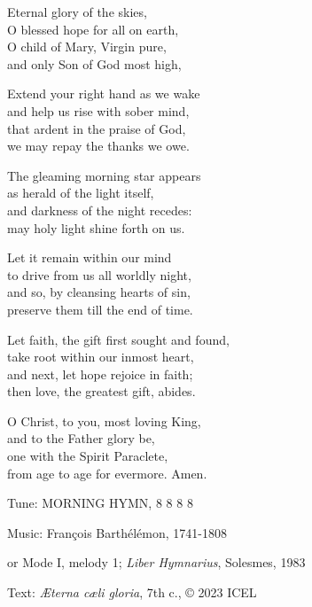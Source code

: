 \hymn

\begin{hymnverse}
Eternal glory of the skies,\\
O blessed hope for all on earth,\\
O child of Mary, Virgin pure,\\
and only Son of God most high,

Extend your right hand as we wake\\
and help us rise with sober mind,\\
that ardent in the praise of God,\\
we may repay the thanks we owe.

The gleaming morning star appears\\
as herald of the light itself,\\
and darkness of the night recedes:\\
may holy light shine forth on us.

Let it remain within our mind\\
to drive from us all worldly night,\\
and so, by cleansing hearts of sin,\\
preserve them till the end of time.

Let faith, the gift first sought and found,\\
take root within our inmost heart,\\
and next, let hope rejoice in faith;\\
then love, the greatest gift, abides.

O Christ, to you, most loving King,\\
and to the Father glory be,\\
one with the Spirit Paraclete,\\
from age to age for evermore. Amen.
\end{hymnverse}

\begin{hymnsource}
Tune: MORNING HYMN, 8 8 8 8

Music: François Barthélémon, 1741-1808

or Mode I, melody 1; \emph{Liber Hymnarius}, Solesmes, 1983

Text: \emph{Æterna cæli gloria}, 7th c., © 2023 ICEL
\end{hymnsource}